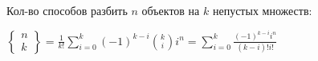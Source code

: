 Кол-во способов разбить $n$ объектов на $k$ непустых множеств:

$\begin{Bmatrix}
    n \\ k
\end{Bmatrix}=\frac{1}{k!}\sum\limits_{i=0}^k(-1)^{k-i}\binom{k}{i}i^n=\sum\limits_{i=0}^k\frac{(-1)^{k-i}i^n}{(k-i)!i!}$
